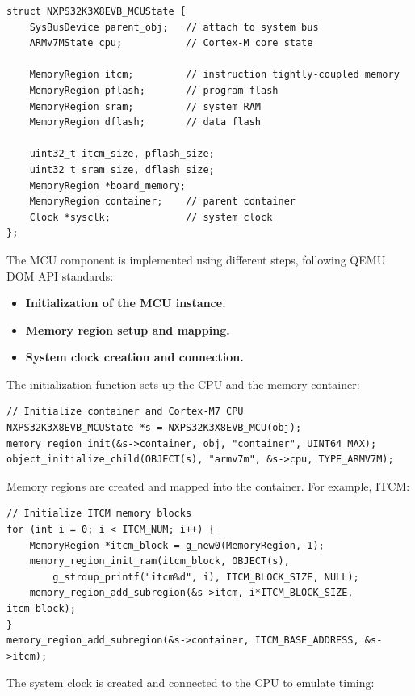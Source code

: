 \documentclass{article}
\begin{document}
\begin{verbatim}
struct NXPS32K3X8EVB_MCUState {
    SysBusDevice parent_obj;   // attach to system bus
    ARMv7MState cpu;           // Cortex-M core state

    MemoryRegion itcm;         // instruction tightly-coupled memory
    MemoryRegion pflash;       // program flash
    MemoryRegion sram;         // system RAM
    MemoryRegion dflash;       // data flash

    uint32_t itcm_size, pflash_size;
    uint32_t sram_size, dflash_size;
    MemoryRegion *board_memory;
    MemoryRegion container;    // parent container
    Clock *sysclk;             // system clock
};

\end{verbatim}
The MCU component is implemented using different steps, following QEMU DOM API standards:
\begin{itemize}
    \item \textbf{Initialization of the MCU instance.}
    \item \textbf{Memory region setup and mapping.}
    \item \textbf{System clock creation and connection.}
\end{itemize}

The initialization function sets up the CPU and the memory container:

\begin{verbatim}
// Initialize container and Cortex-M7 CPU
NXPS32K3X8EVB_MCUState *s = NXPS32K3X8EVB_MCU(obj);
memory_region_init(&s->container, obj, "container", UINT64_MAX);
object_initialize_child(OBJECT(s), "armv7m", &s->cpu, TYPE_ARMV7M);
\end{verbatim}

Memory regions are created and mapped into the container. For example, ITCM:

\begin{verbatim}
// Initialize ITCM memory blocks
for (int i = 0; i < ITCM_NUM; i++) {
    MemoryRegion *itcm_block = g_new0(MemoryRegion, 1);
    memory_region_init_ram(itcm_block, OBJECT(s), 
        g_strdup_printf("itcm%d", i), ITCM_BLOCK_SIZE, NULL);
    memory_region_add_subregion(&s->itcm, i*ITCM_BLOCK_SIZE, itcm_block);
}
memory_region_add_subregion(&s->container, ITCM_BASE_ADDRESS, &s->itcm);
\end{verbatim}

The system clock is created and connected to the CPU to emulate timing:
\end{document}

